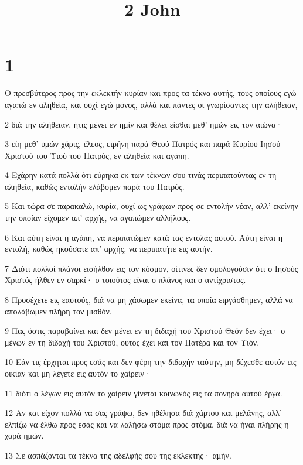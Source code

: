 

\title{2 John}


\chapter{1}

\par Ο πρεσβύτερος προς την εκλεκτήν κυρίαν και προς τα τέκνα αυτής, τους οποίους εγώ αγαπώ εν αληθεία, και ουχί εγώ μόνος, αλλά και πάντες οι γνωρίσαντες την αλήθειαν,
\par 2 διά την αλήθειαν, ήτις μένει εν ημίν και θέλει είσθαι μεθ' ημών εις τον αιώνα·
\par 3 είη μεθ' υμών χάρις, έλεος, ειρήνη παρά Θεού Πατρός και παρά Κυρίου Ιησού Χριστού του Υιού του Πατρός, εν αληθεία και αγάπη.
\par 4 Εχάρην κατά πολλά ότι εύρηκα εκ των τέκνων σου τινάς περιπατούντας εν τη αληθεία, καθώς εντολήν ελάβομεν παρά του Πατρός.
\par 5 Και τώρα σε παρακαλώ, κυρία, ουχί ως γράφων προς σε εντολήν νέαν, αλλ' εκείνην την οποίαν είχομεν απ' αρχής, να αγαπώμεν αλλήλους.
\par 6 Και αύτη είναι η αγάπη, να περιπατώμεν κατά τας εντολάς αυτού. Αύτη είναι η εντολή, καθώς ηκούσατε απ' αρχής, να περιπατήτε εις αυτήν.
\par 7 Διότι πολλοί πλάνοι εισήλθον εις τον κόσμον, οίτινες δεν ομολογούσιν ότι ο Ιησούς Χριστός ήλθεν εν σαρκί· ο τοιούτος είναι ο πλάνος και ο αντίχριστος.
\par 8 Προσέχετε εις εαυτούς, διά να μη χάσωμεν εκείνα, τα οποία ειργάσθημεν, αλλά να απολάβωμεν πλήρη τον μισθόν.
\par 9 Πας όστις παραβαίνει και δεν μένει εν τη διδαχή του Χριστού Θεόν δεν έχει· ο μένων εν τη διδαχή του Χριστού, ούτος έχει και τον Πατέρα και τον Υιόν.
\par 10 Εάν τις έρχηται προς εσάς και δεν φέρη την διδαχήν ταύτην, μη δέχεσθε αυτόν εις οικίαν και μη λέγετε εις αυτόν το χαίρειν·
\par 11 διότι ο λέγων εις αυτόν το χαίρειν γίνεται κοινωνός εις τα πονηρά αυτού έργα.
\par 12 Αν και είχον πολλά να σας γράψω, δεν ηθέλησα διά χάρτου και μελάνης, αλλ' ελπίζω να έλθω προς εσάς και να λαλήσω στόμα προς στόμα, διά να ήναι πλήρης η χαρά ημών.
\par 13 Σε ασπάζονται τα τέκνα της αδελφής σου της εκλεκτής· αμήν.


